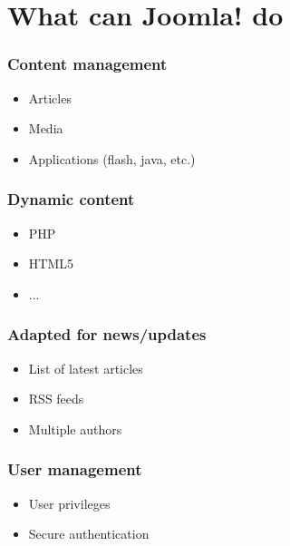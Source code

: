 \section{What can Joomla! do}
\setcounter{subsection}{1}

\begin{frame}
\frametitle{Content management}
  \begin{itemize}[<+->]
    \item Articles
    \item Media
    \item Applications (flash, java, etc.)
  \end{itemize}
\end{frame}

\begin{frame}
\frametitle{Dynamic content}
  \begin{itemize}[<+->]
    \item PHP
    \item HTML5
    \item ...
  \end{itemize}
\end{frame}

\begin{frame}
\frametitle{Adapted for news/updates}
  \begin{itemize}[<+->]
    \item List of latest articles
    \item RSS feeds
    \item Multiple authors
  \end{itemize}
\end{frame}

\begin{frame}
\frametitle{User management}
  \begin{itemize}[<+->]
    \item User privileges
    \item Secure authentication
  \end{itemize}
\end{frame}

